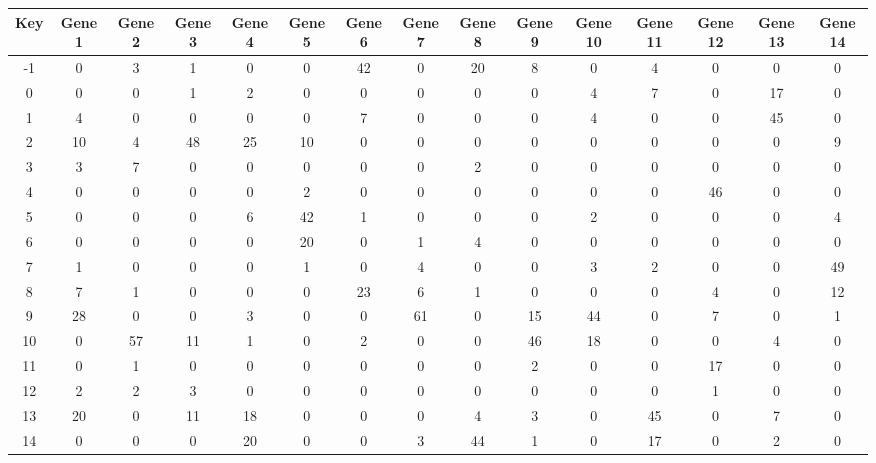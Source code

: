 \begin{tabular}{|c|c|c|c|c|c|c|c|c|c|c|c|c|c|c|}
\hline
Key & Gene 1 & Gene 2 & Gene 3 & Gene 4 & Gene 5 & Gene 6 & Gene 7 & Gene 8 & Gene 9 & Gene 10 & Gene 11 & Gene 12 & Gene 13 & Gene 14 \\
\hline
-1 & 0 & 3 & 1 & 0 & 0 & 42 & 0 & 20 & 8 & 0 & 4 & 0 & 0 & 0 \\
0 & 0 & 0 & 1 & 2 & 0 & 0 & 0 & 0 & 0 & 4 & 7 & 0 & 17 & 0 \\
1 & 4 & 0 & 0 & 0 & 0 & 7 & 0 & 0 & 0 & 4 & 0 & 0 & 45 & 0 \\
2 & 10 & 4 & 48 & 25 & 10 & 0 & 0 & 0 & 0 & 0 & 0 & 0 & 0 & 9 \\
3 & 3 & 7 & 0 & 0 & 0 & 0 & 0 & 2 & 0 & 0 & 0 & 0 & 0 & 0 \\
4 & 0 & 0 & 0 & 0 & 2 & 0 & 0 & 0 & 0 & 0 & 0 & 46 & 0 & 0 \\
5 & 0 & 0 & 0 & 6 & 42 & 1 & 0 & 0 & 0 & 2 & 0 & 0 & 0 & 4 \\
6 & 0 & 0 & 0 & 0 & 20 & 0 & 1 & 4 & 0 & 0 & 0 & 0 & 0 & 0 \\
7 & 1 & 0 & 0 & 0 & 1 & 0 & 4 & 0 & 0 & 3 & 2 & 0 & 0 & 49 \\
8 & 7 & 1 & 0 & 0 & 0 & 23 & 6 & 1 & 0 & 0 & 0 & 4 & 0 & 12 \\
9 & 28 & 0 & 0 & 3 & 0 & 0 & 61 & 0 & 15 & 44 & 0 & 7 & 0 & 1 \\
10 & 0 & 57 & 11 & 1 & 0 & 2 & 0 & 0 & 46 & 18 & 0 & 0 & 4 & 0 \\
11 & 0 & 1 & 0 & 0 & 0 & 0 & 0 & 0 & 2 & 0 & 0 & 17 & 0 & 0 \\
12 & 2 & 2 & 3 & 0 & 0 & 0 & 0 & 0 & 0 & 0 & 0 & 1 & 0 & 0 \\
13 & 20 & 0 & 11 & 18 & 0 & 0 & 0 & 4 & 3 & 0 & 45 & 0 & 7 & 0 \\
14 & 0 & 0 & 0 & 20 & 0 & 0 & 3 & 44 & 1 & 0 & 17 & 0 & 2 & 0 \\
\hline
\end{tabular}